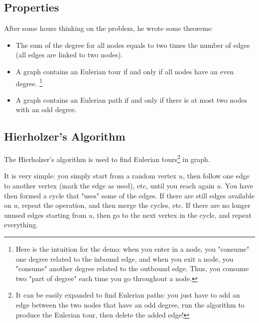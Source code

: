 \subsection{Properties}
After some hours thinking on the problem, he wrote some theorems:

\begin{itemize}
\item The sum of the degree for all nodes equals to two times the number of edges (all edges are linked to two nodes).
\item A graph contains an Eulerian tour if and only if all nodes have an even degree. \footnote{Here is the intuition for the demo: when you enter in a node, you "consume" one degree related to the inbound edge, and when you exit a node, you "consume" another degree related to the outbound edge. Thus, you consume two "part of degree" each time you go throughout a node.}
\item A graph contains an Eulerian path if and only if there is at most two nodes with an odd degree. 
\end{itemize}

\subsection{Hierholzer's Algorithm}
The Hierholzer's algorithm is used to find Eulerian tours\footnote{It can be easily expanded to find Eulerian paths: you just have to add an edge between the two nodes that have an odd degree, run the algorithm to produce the Eulerian tour, then delete the added edge!} in graph.

It is very simple: you simply start from a random vertex $u$, then follow one edge to another vertex (mark the edge as used), etc, until you reach again $u$. You have then formed a cycle that "uses" some of the edges. If there are still edges available on $u$, repeat the operation, and then merge the cycles, etc. If there are no longer unused edges starting from $u$, then go to the next vertex in the cycle, and repeat everything.

